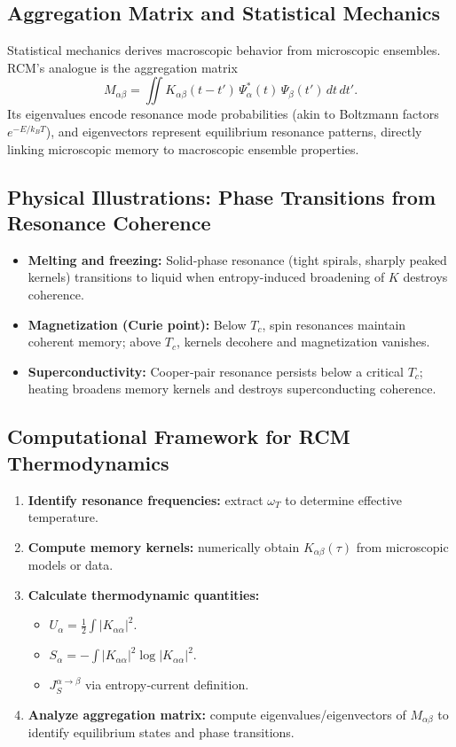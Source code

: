 \subsection{Aggregation Matrix and Statistical Mechanics}

Statistical mechanics derives macroscopic behavior from microscopic ensembles.  RCM’s analogue is the aggregation matrix
\[
  M_{\alpha\beta}
  = \iint
    K_{\alpha\beta}(t - t')\,
    \Psi_{\alpha}^{*}(t)\,\Psi_{\beta}(t')
    \,dt\,dt'.
\]
Its eigenvalues encode resonance mode probabilities (akin to Boltzmann factors \(e^{-E/k_{B}T}\)), and eigenvectors represent equilibrium resonance patterns, directly linking microscopic memory to macroscopic ensemble properties.

\subsection{Physical Illustrations: Phase Transitions from Resonance Coherence}

\begin{itemize}
  \item \textbf{Melting and freezing:}  
    Solid‐phase resonance (tight spirals, sharply peaked kernels) transitions to liquid when entropy-induced broadening of \(K\) destroys coherence.
  \item \textbf{Magnetization (Curie point):}  
    Below \(T_{c}\), spin resonances maintain coherent memory; above \(T_{c}\), kernels decohere and magnetization vanishes.
  \item \textbf{Superconductivity:}  
    Cooper‐pair resonance persists below a critical \(T_{c}\); heating broadens memory kernels and destroys superconducting coherence.
\end{itemize}

\subsection{Computational Framework for RCM Thermodynamics}

\begin{enumerate}
  \item \textbf{Identify resonance frequencies:} extract \(\omega_{T}\) to determine effective temperature.
  \item \textbf{Compute memory kernels:} numerically obtain \(K_{\alpha\beta}(\tau)\) from microscopic models or data.
  \item \textbf{Calculate thermodynamic quantities:}
    \begin{itemize}
      \item \(U_{\alpha} = \tfrac12\!\int|K_{\alpha\alpha}|^{2}\).
      \item \(S_{\alpha} = -\!\int|K_{\alpha\alpha}|^{2}\log|K_{\alpha\alpha}|^{2}\).
      \item \(J_{S}^{\alpha\to\beta}\) via entropy‐current definition.
    \end{itemize}
  \item \textbf{Analyze aggregation matrix:} compute eigenvalues/eigenvectors of \(M_{\alpha\beta}\) to identify equilibrium states and phase transitions.
\end{enumerate}


